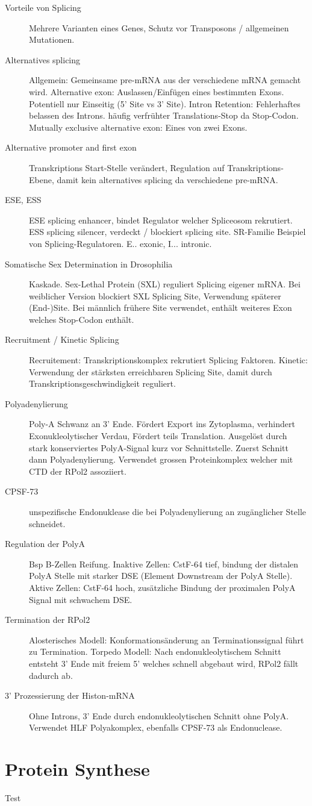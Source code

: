 \documentclass[a4paper,twocolumn,usegeometry,english,fontsize=6,DIV=16]{scrartcl}
\begin{document}
\begin{description}
	\item[Vorteile von Splicing] Mehrere Varianten eines Genes, Schutz vor
		Transposons / allgemeinen Mutationen.
	\item[Alternatives splicing] Allgemein: Gemeinsame pre-mRNA aus der
		verschiedene mRNA gemacht wird. Alternative exon:
		Auslassen/Einfügen eines bestimmten Exons. Potentiell nur
		Einseitig (5' Site vs 3' Site). Intron Retention: Fehlerhaftes
		belassen des Introns.  häufig verfrühter Translations-Stop da
		Stop-Codon. Mutually exclusive alternative exon: Eines von zwei
		Exons.
	\item[Alternative promoter and first exon] Transkriptions Start-Stelle
		verändert, Regulation auf Transkriptions-Ebene, damit kein
		alternatives splicing da verschiedene pre-mRNA.
	\item[ESE, ESS] ESE splicing enhancer, bindet Regulator welcher
		Spliceosom rekrutiert. ESS splicing silencer, verdeckt /
		blockiert splicing site. SR-Familie Beispiel von
		Splicing-Regulatoren. E.. exonic, I... intronic.
	\item[Somatische Sex Determination in Drosophilia] Kaskade. Sex-Lethal
		Protein (SXL) reguliert Splicing eigener mRNA. Bei weiblicher
		Version blockiert SXL Splicing Site, Verwendung späterer
		(End-)Site. Bei männlich frühere Site verwendet, enthält
		weiteres Exon welches Stop-Codon enthält.
	\item[Recruitment / Kinetic Splicing] Recruitement:
		Transkriptionskomplex rekrutiert Splicing Faktoren. Kinetic:
		Verwendung der stärksten erreichbaren Splicing Site, damit
		durch Transkriptionsgeschwindigkeit reguliert.
	\item[Polyadenylierung] Poly-A Schwanz an 3' Ende. Fördert Export ins
		Zytoplasma, verhindert Exonukleolytischer Verdau, Fördert teils
		Translation. Ausgelöst durch stark konserviertes PolyA-Signal
		kurz vor Schnittstelle. Zuerst Schnitt dann Polyadenylierung.
		Verwendet grossen Proteinkomplex welcher mit CTD der RPol2
		assoziiert.
	\item[CPSF-73] unspezifische Endonuklease die bei Polyadenylierung an
		zugänglicher Stelle schneidet.
	\item[Regulation der PolyA] Bsp B-Zellen Reifung. Inaktive Zellen:
		CstF-64 tief, bindung der distalen PolyA Stelle mit starker DSE
		(Element Downstream der PolyA Stelle). Aktive Zellen: CstF-64
		hoch, zusätzliche Bindung der proximalen PolyA Signal mit
		schwachem DSE.
	\item[Termination der RPol2] Alosterisches Modell:
		Konformationsänderung an Terminationssignal führt zu
		Termination. Torpedo Modell: Nach endonukleolytischem Schnitt
		entsteht 3' Ende mit freiem 5' welches schnell abgebaut wird,
		RPol2 fällt dadurch ab.
	\item[3' Prozessierung der Histon-mRNA] Ohne Introns, 3' Ende durch
		endonukleolytischen Schnitt ohne PolyA. Verwendet HLF
		Polyakomplex, ebenfalls CPSF-73 als Endonuclease.
\end{description}

\section{Protein Synthese}
Test
\end{document}
